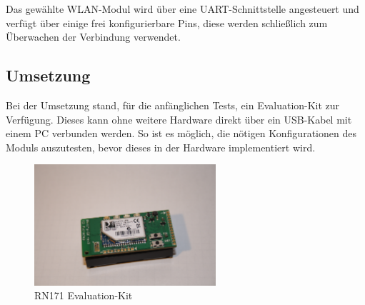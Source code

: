   Das gewählte WLAN-Modul wird über eine UART-Schnittstelle angesteuert und verfügt über einige frei konfigurierbare Pins, diese werden schließlich zum Überwachen der
  Verbindung verwendet.

  \subsection{Umsetzung}
  Bei der Umsetzung stand, für die anfänglichen Tests, ein Evaluation-Kit zur Verfügung. Dieses kann ohne weitere Hardware direkt über ein USB-Kabel mit einem PC verbunden werden.
  So ist es möglich, die nötigen Konfigurationen des Moduls auszutesten, bevor dieses in der Hardware implementiert wird.

  \begin{figure}[H]
    \begin{centering}
      \includegraphics[width = 0.6\textwidth]{Bilder/RN171_EK}
    \par\end{centering}
    \caption[RN171 Evaluation-Kit]{RN171 Evaluation-Kit}
    \label{RN171_EK}
  \end{figure}

